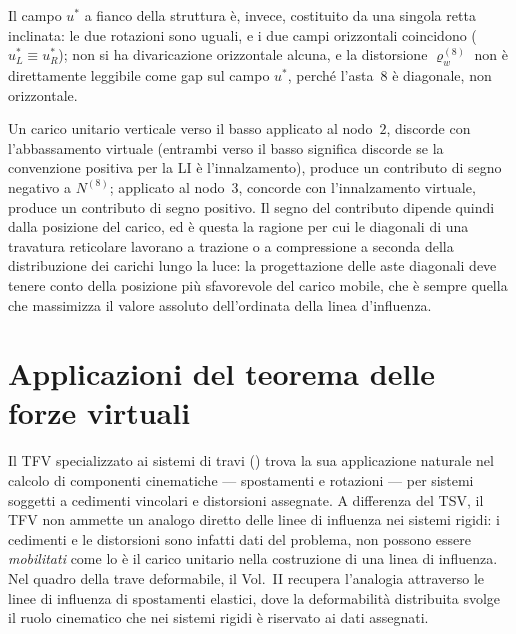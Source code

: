 \begin{esempio}
\begin{svolgimento}
		Il campo $u^*$ a fianco della struttura è, invece, costituito da
		una singola retta inclinata: le due rotazioni sono uguali, e i due
		campi orizzontali coincidono ($u^*_L\equiv u^*_R$); non si ha
		divaricazione orizzontale alcuna, e la distorsione $\varrho_w^{(8)}$
		non è direttamente leggibile come gap sul campo $u^*$, perché
		l'asta~$8$ è diagonale, non orizzontale.
		
		Un carico unitario verticale verso il basso applicato al nodo~$2$,
		discorde con l'abbassamento virtuale (entrambi verso il basso
		significa discorde se la convenzione positiva per la LI è
		l'innalzamento), produce un contributo di segno negativo a
		$N^{(8)}$; applicato al nodo~$3$, concorde con l'innalzamento
		virtuale, produce un contributo di segno positivo. Il segno del
		contributo dipende quindi dalla posizione del carico, ed è questa
		la ragione per cui le diagonali di una travatura reticolare
		lavorano a trazione o a compressione a seconda della distribuzione
		dei carichi lungo la luce: la progettazione delle aste diagonali
		deve tenere conto della posizione più sfavorevole del carico
		mobile, che è sempre quella che massimizza il valore assoluto
		dell'ordinata della linea d'influenza.
	\end{svolgimento}
\end{esempio}

\section{Applicazioni del teorema delle forze virtuali}
\label{sec:applicazioni_TFV}

Il TFV specializzato ai sistemi di travi
() trova la sua applicazione
naturale nel calcolo di componenti cinematiche ---
spostamenti e rotazioni --- per sistemi soggetti a
cedimenti vincolari e distorsioni assegnate. A
differenza del TSV, il TFV non ammette un analogo
diretto delle linee di influenza nei sistemi rigidi: i
cedimenti e le distorsioni sono infatti dati del
problema, non possono essere \emph{mobilitati} come lo
è il carico unitario nella costruzione di una linea di
influenza. Nel quadro della trave deformabile, il
Vol.~II recupera l'analogia attraverso le linee di
influenza di spostamenti elastici, dove la deformabilità
distribuita svolge il ruolo cinematico che nei sistemi
rigidi è riservato ai dati assegnati.

